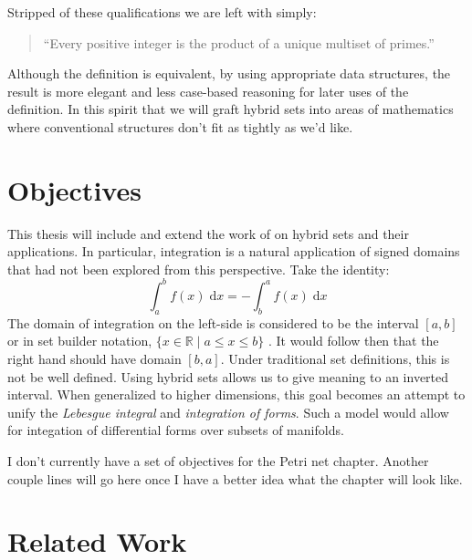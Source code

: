 Stripped of these qualifications we are left with simply:
\begin{quote}
``Every positive integer is the product of a unique multiset of primes.''
\end{quote}
Although the definition is equivalent, by using appropriate data structures, the result is more elegant and less case-based reasoning for later uses of the definition.
In this spirit that we will graft hybrid sets into areas of mathematics where conventional structures don't fit as tightly as we'd like.
		
					
																							
\section{Objectives}



This thesis will include and extend the work of \cite{carette2010} on hybrid sets and their applications.
In particular, integration is a natural application of signed domains that had not been explored from this perspective.
Take the identity:
\begin{equation}
\int_a^b f(x) \;\mathrm{d}x = -\int_b^a f(x) \;\mathrm{d}x
\end{equation}
The domain of integration on the left-side is considered to be the interval $[a,b]$ or in set builder notation, 
$\{ x \in \mathbb{R} \; | \; a \leq x \leq b \}$ .
It would follow then that the right hand should have domain $[b,a]$.
Under traditional set definitions, this is not be well defined.
Using hybrid sets allows us to give meaning to an inverted interval.
When generalized to higher dimensions, this goal becomes an attempt to unify the \emph{Lebesgue integral} and \emph{integration of forms}.
Such a model would allow for integation of differential forms over subsets of manifolds.



I don't currently have a set of objectives for the Petri net chapter.
Another couple lines will go here once I have a better idea what the chapter will look like.



\section{Related Work}



